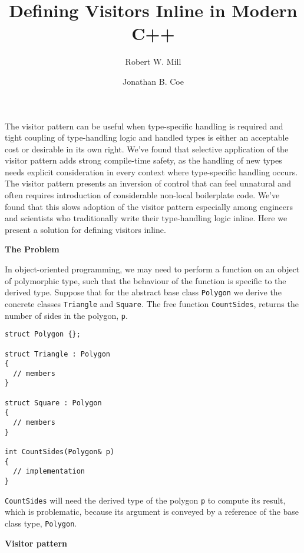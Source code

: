 \documentclass[10pt,a4paper]{article}
\title{Defining Visitors Inline in Modern C++}
\author{Robert W. Mill \and Jonathan B. Coe}
\renewcommand\section[1]{
    \begin{minipage}[c]{0.94\linewidth}
    \large \raggedright \sffamily \textbf{#1}
    \end{minipage}
}
\newcommand\mycode[1]{{\small\texttt{#1}}}
\begin{document}
 
\maketitle

The visitor pattern can be useful when type-specific handling is required and
tight coupling of type-handling logic and handled types is either an acceptable
cost or desirable in its own right. We've found that selective application of
the visitor pattern adds strong compile-time safety, as the handling of new types
needs explicit consideration in every context where type-specific handling
occurs. The visitor pattern presents an inversion of control that can feel
unnatural and often requires introduction of considerable non-local boilerplate
code. We've found that this slows adoption of the visitor pattern especially
among engineers and scientists who traditionally write their type-handling
logic inline. Here we present a solution for defining visitors inline.

\section{The Problem}

In object-oriented programming, we may need to perform a function on an object
of polymorphic type, such that the behaviour of the function is specific to the
derived type. Suppose that for the abstract base class \mycode{Polygon} we
derive the concrete classes \mycode{Triangle} and \mycode{Square}. The free
function \mycode{CountSides}, returns the number of sides in the polygon,
\mycode{p}.

{\small\begin{verbatim}struct Polygon {};

struct Triangle : Polygon 
{ 
  // members 
}

struct Square : Polygon 
{ 
  // members 
}

int CountSides(Polygon& p)
{ 
  // implementation 
}\end{verbatim}}

\mycode{CountSides} will need the derived type of the polygon \mycode{p} to
compute its result, which is problematic, because its argument is conveyed by a
reference of the base class type, \mycode{Polygon}.

\section{Visitor pattern}
\end{document}
